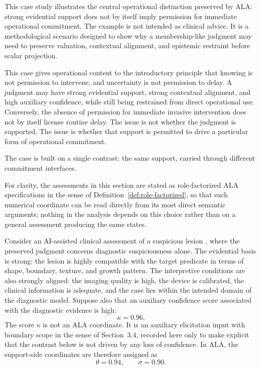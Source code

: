 \documentclass[reqno,final]{amsart}
\theoremstyle{definition}
\theoremstyle{plain}
\theoremstyle{remark}
\begin{document}
This case study illustrates the central operational distinction preserved by ALA: strong evidential support does not by itself imply permission for immediate operational commitment. The example is not intended as clinical advice. It is a methodological scenario designed to show why a membership-like judgment may need to preserve valuation, contextual alignment, and epistemic restraint before scalar projection.

This case gives operational content to the introductory principle that knowing is not permission to intervene, and uncertainty is not permission to delay. A judgment may have strong evidential support, strong contextual alignment, and high auxiliary confidence, while still being restrained from direct operational use. Conversely, the absence of permission for immediate invasive intervention does not by itself license routine delay. The issue is not whether the judgment is supported. The issue is whether that support is permitted to drive a particular form of operational commitment.

The case is built on a single contrast: the same support, carried through different commitment interfaces.

For clarity, the assessments in this section are stated as role-factorized ALA specifications in the sense of Definition~\ref{def:role-factorized}, so that each numerical coordinate can be read directly from its most direct semantic arguments; nothing in the analysis depends on this choice rather than on a general assessment producing the same states.

Consider an AI-assisted clinical assessment of a suspicious lesion \cite{Amann2020}, where the preserved judgment concerns diagnostic suspiciousness alone. The evidential basis is strong: the lesion is highly compatible with the target predicate in terms of shape, boundary, texture, and growth pattern. The interpretive conditions are also strongly aligned: the imaging quality is high, the device is calibrated, the clinical information is adequate, and the case lies within the intended domain of the diagnostic model. Suppose also that an auxiliary confidence score associated with the diagnostic evidence is high:
\[
\kappa=0.96.
\]
The score \(\kappa\) is not an ALA coordinate. It is an auxiliary elicitation input with boundary scope in the sense of Section~3.4, recorded here only to make explicit that the contrast below is not driven by any loss of confidence.
In ALA, the support-side coordinates are therefore assigned as
\[
\theta=0.94,
\qquad
\sigma=0.90.
\]
\end{document}

